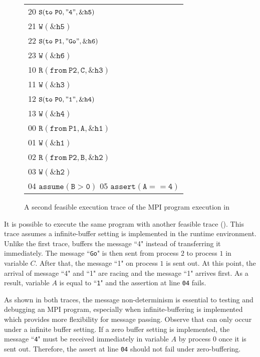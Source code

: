 \begin{figure}[t]
\begin{center}
\setlength{\tabcolsep}{2pt}
\small \begin{tabular}[t]{l}
20 $\mathtt{S(to\ P0, "4", \&h5)}$ \\
21 $\mathtt{W(\&h5)}$\\
22 $\mathtt{S(to\ P1, "Go", \&h6)}$ \\
23 $\mathtt{W(\&h6)}$ \\
\hline
10 $\mathtt{R(from\ P2, C, \&h3)}$ \\
11 $\mathtt{W(\&h3)}$ \\
12 $\mathtt{S(to\ P0, "1", \&h4)}$ \\
13 $\mathtt{W(\&h4)}$ \\
\hline
00 $\mathtt{R(from\ P1, A, \&h1)}$ \\
01 $\mathtt{W(\&h1)}$ \\
02 $\mathtt{R(from\ P2, B, \&h2)}$ \\
03 $\mathtt{W(\&h2)}$ \\
04 $\mathtt{assume(B > 0)}$
05 $\mathtt{assert(A == 4)}$ \\
\hline
\end{tabular}
\end{center}
\caption{A second feasible execution trace of the MPI program execution in }
\label{fig:trace2}
\end{figure}

It is possible to execute the same program with another feasible trace (). This trace assumes a infinite-buffer setting is implemented in the runtime environment. Unlike the first trace,  buffers the message ``4" instead of transferring it immediately. The message ``\texttt{Go}" is then sent from process $2$ to process $1$ in variable $C$. After that, the message ``1" on process $1$ is sent out. At this point, the arrival of message ``4" and ``1" are racing and the message ``1" arrives first. As a result, variable $A$ is equal to ``\texttt{1}" and the assertion at line \texttt{04} fails.

As shown in both traces, the message non-determinism is essential to testing and debugging an MPI program, especially when infinite-buffering is implemented which provides more flexibility for message passing. Observe that  can only occur under a infinite buffer setting. If a zero buffer setting is implemented, the message ``\texttt{4}" must be received immediately in variable $A$ by process $0$ once it is sent out. Therefore, the assert at line \texttt{04} should not fail under zero-buffering. 

